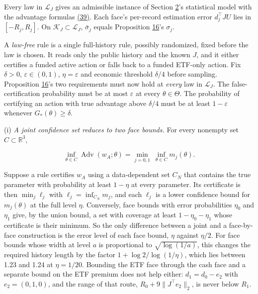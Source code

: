 \documentclass[11pt]{article}
\begin{document}
Every law in \(\mathcal L_J\) gives an admissible instance of
Section \hyperref[sec:2]{2}'s statistical model with the advantage formulas \hyperref[eq:39]{(39)}.
Each face's per-record estimation error \(d_j^\top JU\) lies
in \([-R_j,R_j]\). On \(\mathcal K_J\subset\mathcal L_J\),
\(\bar\sigma_j\) equals Proposition \hyperref[res:Proposition-16]{16}'s \(\sigma_j\).

A \emph{law-free} rule is a single full-history rule, possibly
randomized, fixed before the law is chosen. It reads only the
public history and the known \(J\), and it either certifies a
funded active action or falls back to a funded ETF-only action.
Fix \(\delta>0\), \(\varepsilon\in(0,1)\),
\(\eta=\varepsilon\) and economic threshold \(\delta/4\)
before sampling. Proposition \hyperref[res:Proposition-16]{16}'s two requirements must now
hold at \emph{every} law in \(\mathcal L_J\). The false-certification
probability must be at most \(\varepsilon\) at every
\(\theta\in\Theta\). The probability of certifying an action
with true advantage above \(\delta/4\) must be at least
\(1-\varepsilon\) whenever \(G_*(\theta)\geq\delta\).

(i) \emph{A joint confidence set reduces to two face bounds.} For
every nonempty set \(C\subset\mathbb R^3\),

\begin{equation*}
\inf_{\theta\in C}\operatorname{Adv}(w_A;\theta)
 =\min_{j=0,1}\ \inf_{\theta\in C}m_j(\theta).\tag{53}\label{eq:53}
\end{equation*}

Suppose a rule certifies \(w_A\) using a data-dependent set
\(C_N\) that contains the true parameter with probability at
least \(1-\eta\) at every parameter. Its certificate is then
\(\min_j\ell_j\) with \(\ell_j=\inf_{C_N}m_j\), and each
\(\ell_j\) is a lower confidence bound for \(m_j(\theta)\) at
the full level \(\eta\). Conversely, face bounds with error
probabilities \(\eta_0\) and \(\eta_1\) give, by the union
bound, a set with coverage at least \(1-\eta_0-\eta_1\)
whose certificate is their minimum. So the only difference
between a joint and a face-by-face construction is the error
level of each face bound, \(\eta\) against \(\eta/2\). For
face bounds whose width at level \(a\) is proportional to
\(\sqrt{\log(1/a)}\), this changes the required history
length by the factor \(1+\log2/\log(1/\eta)\), which lies
between 1.23 and 1.24 at \(\eta=1/20\). Bounding the ETF face
through the cash face and a separate bound on the ETF premium
does not help either: \(d_1=d_0-e_2\) with
\(e_2=(0,1,0)\), and the range of that route,
\(R_0+9\|J^\top e_2\|_2\), is never below \(R_1\).
\end{document}
